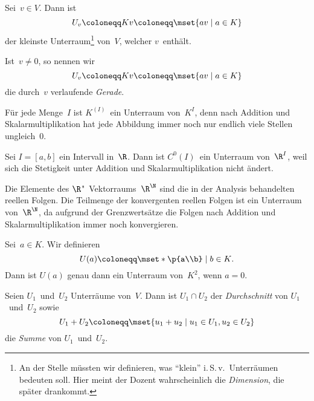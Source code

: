 \documentclass[a4paper]{article}
\begin{document}
\begin{example}
    Sei~$v \in V$. Dann ist
    \begin{equation*}
        U_v \coloneqq Kv \coloneqq \mset{av \mid a \in K}
    \end{equation*}
    der kleinste Unterraum\footnote{An der Stelle müssten wir definieren, was "`klein"' i.\,S.\,v.\ Unterräumen bedeuten soll. Hier meint der Dozent wahrscheinlich die \emph{Dimension}, die später drankommt.} von~$V$, welcher $v$~enthält.
\end{example}

\begin{definition}[Gerade]
    Ist~$v \neq 0$, so nennen wir
    \begin{equation*}
        U_v \coloneqq Kv \coloneqq \mset{av \mid a \in K}
    \end{equation*}
    die durch~$v$ verlaufende \emph{Gerade}.
\end{definition}

\begin{example}
    Für jede Menge~$I$ ist $K^{(I)}$~ein Unterraum von~$K^I$, denn nach Addition und Skalarmultiplikation hat jede Abbildung immer noch nur endlich viele Stellen ungleich~0.
\end{example}

\begin{example}
    Sei $I = [a,b]$ ein Intervall in~$\R$. Dann ist $C^0(I)$~ein Unterraum von~$\R^I$, weil sich die Stetigkeit unter Addition und Skalarmultiplikation nicht ändert.
\end{example}

\begin{example}
    Die Elemente des $\R$"~Vektorraums~$\R^\N$ sind die in der Analysis behandelten reellen Folgen. Die Teilmenge der konvergenten reellen Folgen ist ein Unterraum von~$\R^\N$, da aufgrund der Grenzwertsätze die Folgen nach Addition und Skalarmultiplikation immer noch konvergieren.
\end{example}

\begin{example}
    Sei~$a \in K$. Wir definieren
    \begin{equation*}
        U(a) \coloneqq \mset*{\p{a\\b} \mid b \in K}.
    \end{equation*}
    Dann ist $U(a)$ genau dann ein Unterraum von~$K^2$, wenn $a = 0$.
\end{example}

\begin{definition}
    Seien $U_1$~und~$U_2$ Unterräume von~$V$. Dann ist $U_1 \cap U_2$ der \emph{Durchschnitt} von $U_1$~und~$U_2$ sowie
    \begin{equation*}
        U_1+U_2 \coloneqq \mset{u_1+u_2 \mid u_1 \in U_1, u_2 \in U_2}
    \end{equation*}
    die \emph{Summe} von $U_1$~und~$U_2$.
\end{definition}
\end{document}
